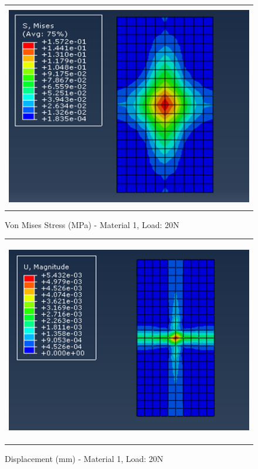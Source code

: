 \documentclass[a4paper,12pt]{article}
\numberwithin{equation}{section}
\numberwithin{figure}{section}
\begin{document}
\begin{figure}[H]
  \centering
  \begin{tabular}{@{}c@{}}
    \includegraphics[width=0.7\linewidth,height=255pt]{Results/Point Loading/M1_VMS_L4.png} \\
  \end{tabular}
  \caption{Von Mises Stress (MPa) - Material 1, Load: 20N}
\end{figure}

\begin{figure}[H]
  \centering
  \begin{tabular}{@{}c@{}}
    \includegraphics[width=0.7\linewidth,height=255pt]{Results/Point Loading/M1_DIS_L4.png} \\
  \end{tabular}
  \caption{Displacement (mm) - Material 1, Load: 20N}
\end{figure}
\end{document}
